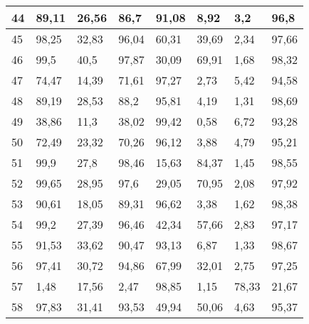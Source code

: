 \begin{longtable}[c]{|l|l|l|l|l|l|l|l|}
44              & 89,11        & 26,56        & 86,7        & 91,08         & 8,92          & 3,2           & 96,8          \\ \hline
45              & 98,25        & 32,83        & 96,04       & 60,31         & 39,69         & 2,34          & 97,66         \\ \hline
46              & 99,5         & 40,5         & 97,87       & 30,09         & 69,91         & 1,68          & 98,32         \\ \hline
47              & 74,47        & 14,39        & 71,61       & 97,27         & 2,73          & 5,42          & 94,58         \\ \hline
48              & 89,19        & 28,53        & 88,2        & 95,81         & 4,19          & 1,31          & 98,69         \\ \hline
49              & 38,86        & 11,3         & 38,02       & 99,42         & 0,58          & 6,72          & 93,28         \\ \hline
50              & 72,49        & 23,32        & 70,26       & 96,12         & 3,88          & 4,79          & 95,21         \\ \hline
51              & 99,9         & 27,8         & 98,46       & 15,63         & 84,37         & 1,45          & 98,55         \\ \hline
52              & 99,65        & 28,95        & 97,6        & 29,05         & 70,95         & 2,08          & 97,92         \\ \hline
53              & 90,61        & 18,05        & 89,31       & 96,62         & 3,38          & 1,62          & 98,38         \\ \hline
54              & 99,2         & 27,39        & 96,46       & 42,34         & 57,66         & 2,83          & 97,17         \\ \hline
55              & 91,53        & 33,62        & 90,47       & 93,13         & 6,87          & 1,33          & 98,67         \\ \hline
56              & 97,41        & 30,72        & 94,86       & 67,99         & 32,01         & 2,75          & 97,25         \\ \hline
57              & 1,48         & 17,56        & 2,47        & 98,85         & 1,15          & 78,33         & 21,67         \\ \hline
58              & 97,83        & 31,41        & 93,53       & 49,94         & 50,06         & 4,63          & 95,37         \\ \hline

\end{longtable}
